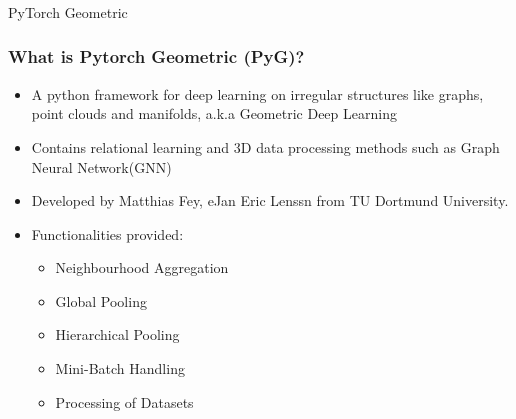 \begin{frame}[fragile]\frametitle{}
\begin{center}
{\Large PyTorch Geometric}
\end{center}
\end{frame}


\begin{frame}[fragile]\frametitle{What is Pytorch Geometric (PyG)?}

\begin{itemize}
\item A python framework for deep learning on irregular structures like graphs, point clouds and manifolds, a.k.a Geometric Deep Learning 
\item Contains relational learning and 3D data processing methods such as Graph Neural Network(GNN)
\item Developed by Matthias Fey, eJan Eric Lenssn from TU Dortmund University. 
\item Functionalities provided:
	\begin{itemize}
	\item Neighbourhood Aggregation
	\item Global Pooling
	\item Hierarchical Pooling
	\item Mini-Batch Handling
	\item Processing of Datasets
	\end{itemize}
\end{itemize}

\end{frame}


